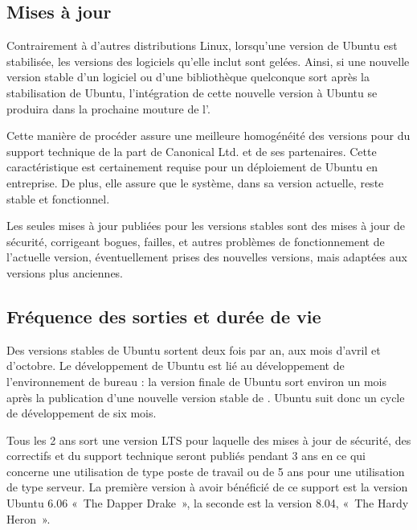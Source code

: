 \subsection{Mises à jour}
Contrairement à d'autres distributions Linux, lorsqu'une version de Ubuntu est stabilisée, les versions des logiciels qu'elle inclut sont gelées. Ainsi, si une nouvelle version stable d'un logiciel ou d'une bibliothèque quelconque sort après la stabilisation de Ubuntu, l'intégration de cette nouvelle version à Ubuntu se produira dans la prochaine mouture de l'.\par
Cette manière de procéder assure une meilleure homogénéité des versions pour du support technique de la part de Canonical Ltd. et de ses partenaires. Cette caractéristique est certainement requise pour un déploiement de Ubuntu en entreprise. De plus, elle assure que le système, dans sa version actuelle, reste stable et fonctionnel.\par
Les seules mises à jour publiées pour les versions stables sont des mises à jour de sécurité, corrigeant bogues, failles, et autres problèmes de fonctionnement de l'actuelle version, éventuellement prises des nouvelles versions, mais adaptées aux versions  plus anciennes.
\subsection{Fréquence des sorties et durée de vie}
Des versions stables de Ubuntu sortent deux fois par an, aux mois d'avril et d'octobre. Le développement de Ubuntu est lié au développement de l'environnement de bureau  : la version finale de Ubuntu sort environ un mois après la publication d'une nouvelle version stable de . Ubuntu suit donc un cycle de développement de six mois.\par
Tous les 2 ans sort une version LTS pour laquelle des mises à jour de sécurité, des correctifs et du support technique seront publiés pendant 3 ans en ce qui concerne une utilisation de type poste de travail ou de 5 ans pour une utilisation de type serveur. La première version à avoir bénéficié de ce support est la version Ubuntu 6.06 «~The Dapper Drake~», la seconde est la version 8.04, «~The Hardy Heron~».
